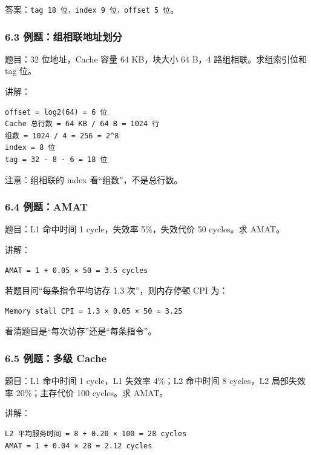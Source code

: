 \documentclass[
]{ctexart}
\newcommand{\passthrough}[1]{#1}
\begin{document}
答案：\passthrough{\lstinline!tag 18 位，index 9 位，offset 5 位!}。

\subsubsection{6.3
例题：组相联地址划分}\label{ux4f8bux9898ux7ec4ux76f8ux8054ux5730ux5740ux5212ux5206}

题目：32 位地址，Cache 容量 64 KB，块大小 64 B，4 路组相联。求组索引位和
tag 位。

讲解：

\begin{lstlisting}
offset = log2(64) = 6 位
Cache 总行数 = 64 KB / 64 B = 1024 行
组数 = 1024 / 4 = 256 = 2^8
index = 8 位
tag = 32 - 8 - 6 = 18 位
\end{lstlisting}

注意：组相联的 index 看``组数''，不是总行数。

\subsubsection{6.4 例题：AMAT}\label{ux4f8bux9898amat}

题目：L1 命中时间 1 cycle，失效率 5\%，失效代价 50 cycles。求 AMAT。

讲解：

\begin{lstlisting}
AMAT = 1 + 0.05 × 50 = 3.5 cycles
\end{lstlisting}

若题目问``每条指令平均访存 1.3 次''，则内存停顿 CPI 为：

\begin{lstlisting}
Memory stall CPI = 1.3 × 0.05 × 50 = 3.25
\end{lstlisting}

看清题目是``每次访存''还是``每条指令''。

\subsubsection{6.5 例题：多级
Cache}\label{ux4f8bux9898ux591aux7ea7-cache}

题目：L1 命中时间 1 cycle，L1 失效率 4\%；L2 命中时间 8 cycles，L2
局部失效率 20\%；主存代价 100 cycles。求 AMAT。

讲解：

\begin{lstlisting}
L2 平均服务时间 = 8 + 0.20 × 100 = 28 cycles
AMAT = 1 + 0.04 × 28 = 2.12 cycles
\end{lstlisting}
\end{document}
